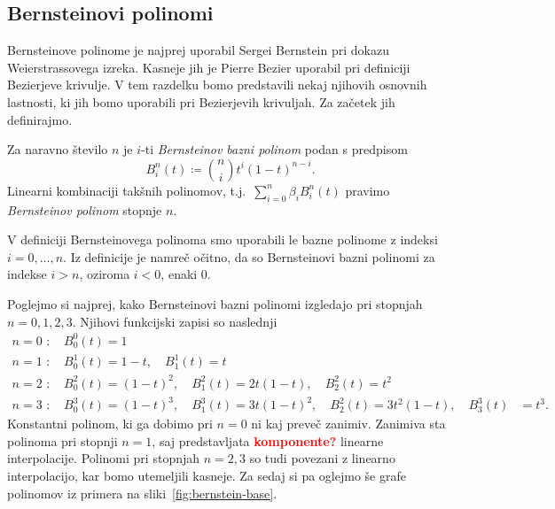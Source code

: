 \documentclass[isrm2, tisk]{fmfdelo}
\newcommand{\bernstein}[2]{\binom{#1}{#2}t^{#2}(1-t)^{#1-#2}}
\newcommand{\lilb}[2]{B_{#1}^{#2}(t)}
\newcommand{\bernsteinsum}[2]{\sum_{#1=0}^{#2} \beta_{#1}\lilb{#1}{#2}}
\newcommand{\bsum}{\bernsteinsum{i}{n}}
\newcommand{\mycomment}[1]{\textbf{\textcolor{red}{#1}}}
\begin{document}
    \subsection{Bernsteinovi polinomi}\label{subsec:bernsteinovi-polinomi}
    Bernsteinove polinome je najprej uporabil Sergei Bernstein pri dokazu Weierstrassovega izreka.
    Kasneje jih je Pierre Bezier uporabil pri definiciji Bezierjeve krivulje.
    V tem razdelku bomo predstavili nekaj njihovih osnovnih lastnosti, ki jih bomo uporabili pri Bezierjevih krivuljah.
    Za začetek jih definirajmo.
    \begin{definicija}
        Za naravno število $n$ je $i$-ti \textit{Bernsteinov bazni polinom} podan s predpisom \[B_i^n(t)\coloneqq\bernstein{n}{i}.\]
        Linearni kombinaciji takšnih polinomov, t.j.\ $\bsum$ pravimo \textit{Bernsteinov polinom} stopnje $n$.
    \end{definicija}
    \begin{opomba}
        V definiciji Bernsteinovega polinoma smo uporabili le bazne polinome z indeksi $i=0,\ldots,n$.
        Iz definicije je namreč očitno, da so Bernsteinovi bazni polinomi za indekse $i>n$, oziroma $i<0$, enaki $0$.
    \end{opomba}
    \begin{primer}\label{primer:bernsteinovi}
        Poglejmo si najprej, kako Bernsteinovi bazni polinomi izgledajo pri stopnjah $n=0,1,2,3$.
        Njihovi funkcijski zapisi so naslednji
        \begin{align*}
            n=0\text{ : } &B_{0}^{0}(t) = 1 \\
            n=1\text{ : } &B_{0}^{1}(t) = 1-t,\quad B_{1}^{1}(t) = t \\
            n=2\text{ : } &B_{0}^{2}(t) = (1-t)^2,\quad B_{1}^{2}(t) = 2t(1-t),\quad B_{2}^{2}(t) = t^2  \\
            n=3\text{ : } &B_{0}^{3}(t) = (1-t)^3,\quad B_{1}^{3}(t) = 3t(1-t)^2,\quad B_{2}^{2}(t) = 3t^2(1-t),\quad B_{3}^{3}(t) &= t^3.
        \end{align*}
        Konstantni polinom, ki ga dobimo pri $n=0$ ni kaj preveč zanimiv.
        Zanimiva sta polinoma pri stopnji $n=1$, saj predstavljata \mycomment{komponente?} linearne interpolacije.
        Polinomi pri stopnjah $n=2,3$ so tudi povezani z linearno interpolacijo, kar bomo utemeljili kasneje.
        Za sedaj si pa oglejmo še grafe polinomov iz primera na sliki~\ref{fig:bernstein-base}.
    \end{primer}
\end{document}
